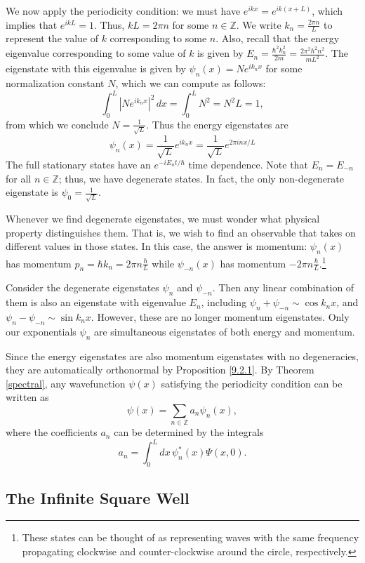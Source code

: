 We now apply the periodicity condition: we must have $e^{ikx}=e^{ik(x+L)}$, which implies that $e^{ikL}=1$. Thus, $kL=2\pi n$ for some $n\in\mathbb{Z}$. We write $k_n=\frac{2\pi n}{L}$ to represent the value of $k$ corresponding to some $n$. Also, recall that the energy eigenvalue corresponding to some value of $k$ is given by $E_n=\frac{\hbar^2k_n^2}{2m}=\frac{2\pi^2\hbar^2n^2}{mL^2}$. The eigenstate with this eigenvalue is given by $\psi_n(x)=Ne^{ik_nx}$ for some normalization constant $N$, which we can compute as follows: $$\int_0^L|Ne^{ik_nx}|^2\,dx=\int_0^L N^2=N^2L=1,$$from which we conclude $N=\frac{1}{\sqrt{L}}$. Thus the energy eigenstates are $$\boxed{\psi_n(x)=\frac{1}{\sqrt{L}}e^{ik_nx}=\frac{1}{\sqrt{L}}e^{2\pi inx/L}}$$The full stationary states have an $e^{-iE_nt/\hbar}$ time dependence. Note that $E_n=E_{-n}$ for all $n\in\mathbb{Z}$; thus, we have degenerate states. In fact, the only non-degenerate eigenstate is $\psi_0=\frac{1}{\sqrt{L}}$. 

Whenever we find degenerate eigenstates, we must wonder what physical property distinguishes them. That is, we wish to find an observable that takes on different values in those states. In this case, the answer is momentum: $\psi_n(x)$ has momentum $p_n=\hbar k_n=2\pi n\frac{\hbar}{L}$ while $\psi_{-n}(x)$ has momentum $-2\pi n\frac{\hbar}{L}$.\footnote{These states can be thought of as representing waves with the same frequency propagating clockwise and counter-clockwise around the circle, respectively.}

Consider the degenerate eigenstates $\psi_n$ and $\psi_{-n}$. Then any linear combination of them is also an eigenstate with eigenvalue $E_n$, including $\psi_n+\psi_{-n}\sim \cos k_nx$, and $\psi_n-\psi_{-n}\sim\sin k_nx$. However, these are no longer momentum eigenstates. Only our exponentials $\psi_n$ are simultaneous eigenstates of both energy and momentum.

Since the energy eigenstates are also momentum eigenstates with no degeneracies, they are automatically orthonormal by Proposition \ref{9.2.1}. By Theorem \ref{spectral}, any wavefunction $\psi(x)$ satisfying the periodicity condition can be written as $$\psi(x)=\sum_{n\in\mathbb{Z}}a_n\psi_n(x),$$where the coefficients $a_n$ can be determined by the integrals $$a_n=\int_0^L dx\,\psi_n^*(x)\Psi(x,0).$$

\subsection{The Infinite Square Well}\label{infinite_square_well}

